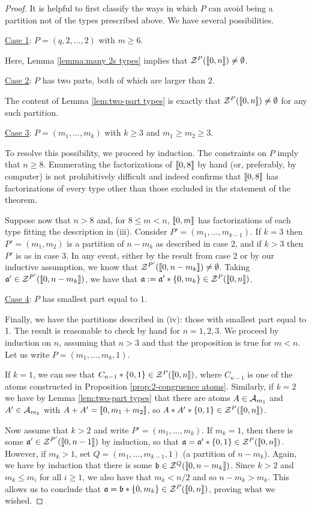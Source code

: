 \begin{proof}
	It is helpful to first classify the ways in which $P$ can avoid being a partition not of the types prescribed above.  
	We have several possibilities.
	
	
	\underline{Case 1}: $P = (q,2,\dots, 2)$ with $m\ge 6$.
	
	Here, Lemma \ref{lemma:many 2s types} implies that $\mathcal{Z}^P(\llbracket 0,n \rrbracket) \neq \emptyset$.
	
	\underline{Case 2}: $P$ has two parts, both of which are larger than $2$.
	
	The content of Lemma \ref{lem:two-part types} is exactly that $\mathcal{Z}^P(\llbracket 0,n \rrbracket) \neq \emptyset$ for any such partition.
	
	\underline{Case 3}: $P = (m_1,\dots, m_k)$ with $k\ge 3$ and $m_1\ge m_2 \ge 3$.
	
	To resolve this possibility, we proceed by induction.
	The constraints on $P$ imply that $n\ge 8$.  
	Enumerating the factorizations of $\llbracket 0,8 \rrbracket$ by hand (or, preferably, by computer) is not prohibitively difficult and indeed confirms that $\llbracket 0,8 \rrbracket$ has factorizations of every type other than those excluded in the statement of the theorem.
	
	Suppose now that $n > 8$ and, for $8\le m < n$, $\llbracket 0,m \rrbracket$ has factorizations of each type fitting the description in (iii).
	Consider $P' = (m_1,\dots, m_{k-1})$.
	If $k=3$ then $P'=(m_1,m_2)$ is a partition of $n-m_k$ as described in case 2, and if $k>3$ then $P'$ is as in case 3.  
	In any event, either by the result from case 2 or by our inductive assumption, we know that $\mathcal{Z}^{P'}(\llbracket 0,n-m_k \rrbracket) \neq \emptyset$.
	Taking $\mathfrak{a}' \in \mathcal{Z}^{P'}(\llbracket 0,n-m_k \rrbracket)$, we have that $\mathfrak{a} := \mathfrak{a}' * \{0,m_k\} \in \mathcal{Z}^P(\llbracket 0,n \rrbracket)$.
	
	\underline{Case 4}: $P$ has smallest part equal to $1$.
	
	Finally, we have the partitions described in (iv): those with smallest part equal to 1.
	The result is reasonable to check by hand for $n=1,2,3$.
	We proceed by induction on $n$, assuming that $n>3$ and that the proposition is true for $m<n$.
	Let us write $P = (m_1,\dots, m_k, 1)$.
	
	If $k=1$, we can see that $C_{n-1}*\{0,1\}\in \mathcal{Z}^P(\llbracket 0,n \rrbracket)$, where $C_{n-1}$ is one of the atoms constructed in Proposition \ref{prop:2-congruence atoms}.
	Similarly, if $k=2$ we have by Lemma \ref{lem:two-part types} that there are atoms $A\in \mathcal{A}_{m_1}$ and $A'\in \mathcal{A}_{m_2}$ with $A+A' = \llbracket 0,m_1+m_2 \rrbracket$, so $A*A'* \{0,1\}\in \mathcal{Z}^P(\llbracket 0,n \rrbracket)$.
	
	Now assume that $k>2$ and write $P' = (m_1,\dots, m_k)$.
	If $m_k=1$, then there is some $\mathfrak{a}'\in \mathcal{Z}^{P'}(\llbracket 0,n-1 \rrbracket)$ by induction, so that $\mathfrak{a} = \mathfrak{a}' * \{0,1\}\in \mathcal{Z}^P(\llbracket 0,n \rrbracket)$.
	However, if $m_k > 1$, set $Q = (m_1,\dots, m_{k-1}, 1)$ (a partition of $n-m_k$).
	Again, we have by induction that there is some $\mathfrak{b} \in \mathcal{Z}^Q(\llbracket 0, n-m_k \rrbracket)$.
	Since $k>2$ and $m_k \le m_i$ for all $i\ge 1$, we also have that $m_k < n/2$ and so $n-m_k > m_k$.
	This allows us to conclude that $\mathfrak{a} = \mathfrak{b} * \{0,m_k\} \in \mathcal{Z}^P(\llbracket 0,n \rrbracket)$, proving what we wished.
\end{proof}

